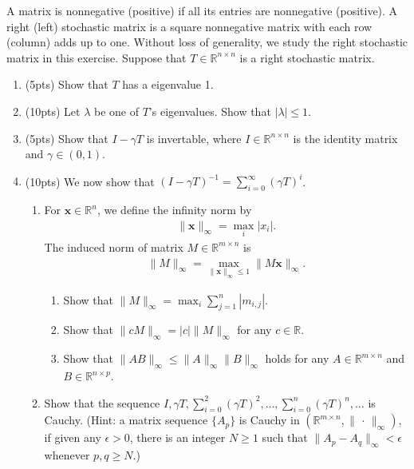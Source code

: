 \documentclass[11pt,letter,notitlepage]{article}
\begin{document}
\newpage
\begin{exercise}
    A matrix is nonnegative (positive) if all its entries are nonnegative (positive). A right (left) stochastic matrix is a square nonnegative matrix with each row (column) adds up to one. Without loss of generality, we study the right stochastic matrix in this exercise. Suppose that $T \in \mathbb{R}^{n \times n}$ is a right stochastic matrix.
    \begin{enumerate}
        \item (5pts) Show that $T$ has a eigenvalue 1.
        \item (10pts) Let $\lambda$ be one of $T$'s eigenvalues. Show that $|\lambda|\leq 1$.
        \item (5pts) Show that $I-\gamma T$ is invertable, where $I\in \mathbb{R}^{n\times n}$ is the identity matrix and $\gamma\in(0,1)$.
        \item (10pts) We now show that $(I-\gamma T)^{-1}=\sum_{i=0}^\infty(\gamma T)^i$.
            \begin{enumerate}
                \item For $\mathbf{x}\in\mathbb{R}^n$, we define the infinity norm by
                    \begin{align*}
                        \|\mathbf{x}\|_{\infty}=\max_{i}|x_i|.
                    \end{align*}
                    The induced norm of matrix $M\in\mathbb{R}^{m\times n}$ is
                    \begin{align*}
                        \|M\|_{\infty}=\max_{\|\mathbf{x}\|_{\infty}\leq 1}\|M\mathbf{x}\|_{\infty}.
                    \end{align*}
                        \begin{enumerate}
                            \item Show that $\|M\|_{\infty}=\max_{i}\sum_{j=1}^n|m_{i,j}|$.
                            \item Show that $\|cM\|_{\infty}=|c|\|M\|_{\infty}$ for any $c\in\mathbb{R}$.
                            \item Show that $\|AB\|_{\infty}\leq\|A\|_{\infty}\|B\|_{\infty}$ holds for any $A\in\mathbb{R}^{m\times n}$ and $B\in\mathbb{R}^{n\times p}$.
                        \end{enumerate}
                \item Show that the sequence $I, \gamma T, \sum_{i=0}^2(\gamma T)^2,\dots,\sum_{i=0}^n(\gamma T)^n,\ldots$ is Cauchy. (Hint: a matrix sequence $\{A_p\}$ is Cauchy in $(\mathbb{R}^{m\times n}, \|\, \cdot \, \|_{\infty})$, if given any $\epsilon>0$, there is an integer $N\geq 1$ such that $\| A_p-A_q \|_{\infty}<\epsilon$ whenever $p,q \geq N$.)

\end{enumerate}
\end{enumerate}
\end{exercise}
\end{document}
